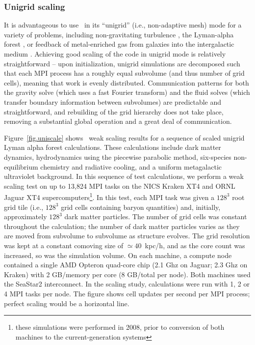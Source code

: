 \subsubsection{Unigrid scaling }

It is advantageous to use \enzo\ in its ``unigrid'' (i.e.,
non-adaptive mesh) mode for a variety of problems, including
non-gravitating turbulence
\citep[e.g.,][]{2002ApJ...569L.127K,Kritsuk04}, the Lyman-alpha forest
\citep{2005MNRAS.361...70J,2009MNRAS.399.1934P}, or feedback of
metal-enriched gas from galaxies into the intergalactic medium
\citep{2004ApJ...601L.115N,2011ApJ...731....6S}.  Achieving good
scaling of the code in unigrid mode is relatively straightforward --
upon initialization, unigrid simulations are decomposed such that each
MPI process has a roughly equal subvolume (and thus number of grid
cells), meaning that work is evenly distributed.  Communication
patterns for both the gravity solve (which uses a fast Fourier
transform) and the fluid solves (which transfer boundary information
between subvolumes) are predictable and straightforward, and
rebuilding of the grid hierarchy does not take place, removing a
substantial global operation and a great deal of communication.

Figure~\ref{fig.uniscale} shows \enzo\ weak scaling results for a
sequence of scaled unigrid Lyman alpha forest calculations. These
calculations include dark matter dynamics, hydrodynamics using the
piecewise parabolic method, six-species non-equilibrium chemistry and
radiative cooling, and a uniform metagalactic ultraviolet background.
In this sequence of test calculations, we perform a weak scaling test
on up to 13,824 MPI tasks on the NICS Kraken XT4 and ORNL Jaguar XT4
supercomputers\footnote{these simulations were performed in 2008,
prior to conversion of both machines to the current-generation
systems}.  In this test, each MPI task was given a $128^3$ root grid
tile (i.e., $128^3$ grid cells containing baryon quantities) and,
initially, approximately $128^3$ dark matter particles.  The number of
grid cells was constant throughout the calculation; the number of dark
matter particles varies as they are moved from subvolume to subvolume
as structure evolves.  The grid resolution was kept at a constant
comoving size of $\simeq 40$~kpc/h, and as the core count was
increased, so was the simulation volume.  On each machine, a compute
node contained a single AMD Opteron quad-core chip (2.1 Ghz on Jaguar;
2.3 Ghz on Kraken) with 2 GB/memory per core (8 GB/total per node).
Both machines used the SeaStar2 interconnect.  In the scaling study,
calculations were run with 1, 2 or 4 MPI tasks per node.  The figure
shows cell updates per second per MPI process; perfect scaling would
be a horizontal line.

